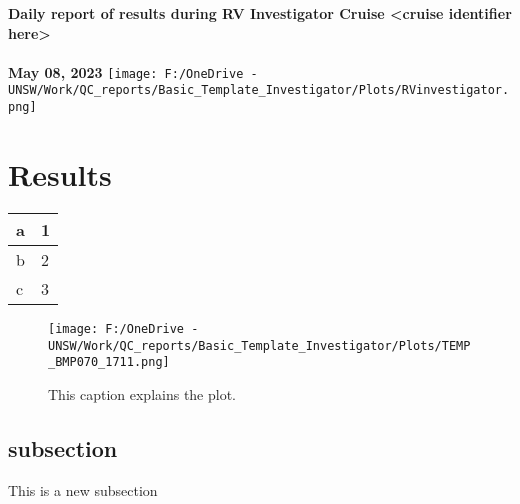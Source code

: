 \documentclass{article}%
\begin{document}
%
\large%
\fontsize{18}{16}%
\begin{titlepage}%
\begin{center}%
\LARGE%
\textbf{Daily report of results during RV Investigator Cruise <cruise identifier here>}%
\\%
\\%
\vfill%
\vfill%
\newline%
\textbf{May 08, 2023}%
\vfill%
\texttt{[image: F:/OneDrive - UNSW/Work/QC\_reports/Basic\_Template\_Investigator/Plots/RVinvestigator.png]}%
\end{center}%
\end{titlepage}%
\tableofcontents%
\section{Results}%
\label{sec:Results}%
\begin{tabular}{|l|l|}%
\hline%
a&1\\%
\hline%
b&2\\%
\hline%
c&3\\%
\hline%
\end{tabular}%


\begin{figure}[htbp]%
\centering%
\texttt{[image: F:/OneDrive - UNSW/Work/QC\_reports/Basic\_Template\_Investigator/Plots/TEMP\_BMP070\_1711.png]}%
\caption{This caption explains the plot.}%
\end{figure}

%
\subsection{subsection}%
\label{subsec:subsection}%
This is a new subsection

%
\end{document}
